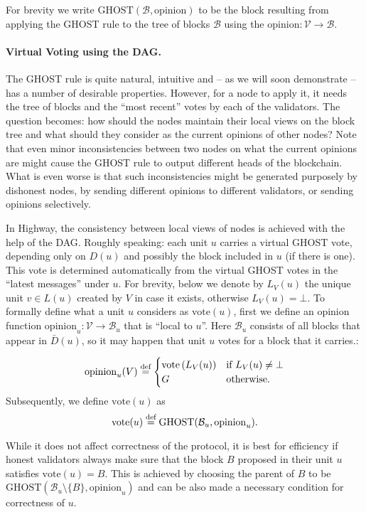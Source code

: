 \documentclass[12pt, fleqn]{article}
\newcommand{\vote}{\mathrm{vote}}
\newcommand{\ghost}{\mathrm{GHOST}}
\newcommand{\opinion}{\mathrm{opinion}}
\newcommand{\defeq}{\stackrel{\textup{def}}{=}}
\newcommand{\cB}{\mathcal{B}}
\newcommand{\cV}{\mathcal{V}}
\newcommand{\inparen}[1]{\left(#1\right)}
\begin{document}
For brevity we write $\ghost(\cB, \opinion)$ to be the block resulting from applying the GHOST rule to the tree of blocks $\cB$ using the $\opinion:\cV \to \cB$.

\paragraph{Virtual Voting using the DAG.}

The GHOST rule is quite natural, intuitive and -- as we will soon demonstrate -- has a number of desirable properties.
%
However, for a node to apply it, it needs the tree of blocks and the ``most recent'' votes by each of the validators. 
%
The question becomes: how should the nodes maintain their local views on the block tree and what should they consider as the current opinions of other nodes? 
%
Note that even minor inconsistencies between two nodes on what the current opinions are might cause the GHOST rule to output different heads of the blockchain.
%
What is even worse is that such inconsistencies might be generated purposely by dishonest nodes, by sending different opinions to different validators, or sending opinions selectively.

In Highway, the consistency between local views of nodes is achieved with the help of the DAG.
%
Roughly speaking: each unit $u$ carries a virtual GHOST vote, depending only on $D(u)$ and possibly the block included in $u$ (if there is one). This vote is determined automatically from the virtual GHOST votes in the ``latest messages'' under $u$.
%
For brevity, below we denote by $L_V(u)$ the unique unit $v\in L(u)$ created by $V$ in case it exists, otherwise $L_V(u)=\bot$.
%
To formally define what a unit $u$ considers as $\vote(u)$, first we define an opinion function $\opinion_u: \cV \to \cB_u$ that is ``local to $u$''. Here $\cB_u$ consists of all blocks that appear in $\bar{D}(u)$, so it may happen that unit $u$ votes for a block that it carries.:


$$
    \opinion_u(V) \defeq \begin{cases}
    \vote\inparen{L_V(u)} &\mbox{if }  L_V(u)\neq \bot\\
    G &\mbox{otherwise}.
    \end{cases}
$$
Subsequently, we define $\vote(u)$ as
$$\vote(u) \defeq \ghost(\cB_u, \opinion_u).$$

While it does not affect correctness of the protocol, it is best for efficiency if honest validators always make sure that the block $B$ proposed in their unit $u$ satisfies $\vote(u)=B$.
%
This is achieved by choosing the parent of $B$ to be $\ghost(\cB_u \setminus \{B\}, \opinion_u)$ and can be also made a necessary condition for correctness of $u$.
\end{document}
